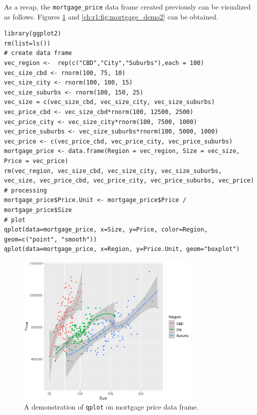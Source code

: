 As a recap, the \verb|mortgage_price| data frame created previously can be visualized as follows. Figures \ref{ch:r1:fig:mortgage_demo1} and \ref{ch:r1:fig:mortgage_demo2} can be obtained.
\begin{lstlisting}
library(ggplot2)
rm(list=ls())
# create data frame
vec_region <-  rep(c("CBD","City","Suburbs"),each = 100)
vec_size_cbd <- rnorm(100, 75, 10)
vec_size_city <- rnorm(100, 100, 15)
vec_size_suburbs <- rnorm(100, 150, 25)
vec_size = c(vec_size_cbd, vec_size_city, vec_size_suburbs)
vec_price_cbd <- vec_size_cbd*rnorm(100, 12500, 2500)
vec_price_city <- vec_size_city*rnorm(100, 7500, 1000)
vec_price_suburbs <- vec_size_suburbs*rnorm(100, 5000, 1000)
vec_price <- c(vec_price_cbd, vec_price_city, vec_price_suburbs)
mortgage_price <- data.frame(Region = vec_region, Size = vec_size, Price = vec_price)
rm(vec_region, vec_size_cbd, vec_size_city, vec_size_suburbs, vec_size, vec_price_cbd, vec_price_city, vec_price_suburbs, vec_price)
# processing
mortgage_price$Price.Unit <- mortgage_price$Price / mortgage_price$Size
# plot
qplot(data=mortgage_price, x=Size, y=Price, color=Region, geom=c("point", "smooth"))
qplot(data=mortgage_price, x=Region, y=Price.Unit, geom="boxplot")
\end{lstlisting}

\begin{figure}
	\centering
	\includegraphics[width=250pt]{chapters/ch-r/figures/mortgage_demo1.png}
	\caption{A demonstration of \texttt{qplot} on mortgage price data frame.} \label{ch:r1:fig:mortgage_demo1}
\end{figure}

